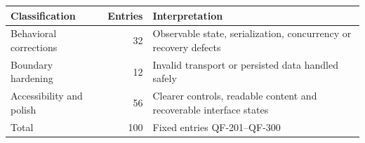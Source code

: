 \begin{tabularx}{\linewidth}{@{}lrX@{}}
\toprule
Classification & Entries & Interpretation\\
\midrule
Behavioral corrections & 32 & Observable state, serialization, concurrency or recovery defects\\
Boundary hardening & 12 & Invalid transport or persisted data handled safely\\
Accessibility and polish & 56 & Clearer controls, readable content and recoverable interface states\\
\midrule
Total & 100 & Fixed entries QF-201--QF-300\\
\bottomrule
\end{tabularx}
